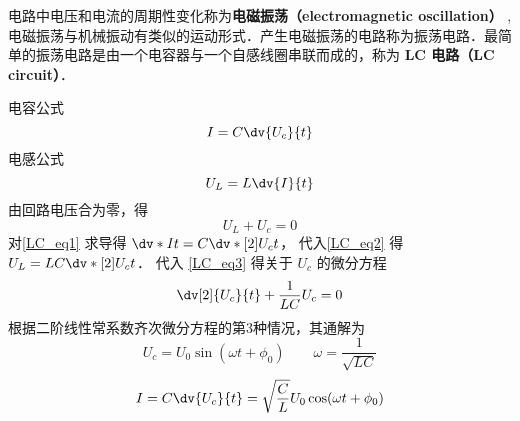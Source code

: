 
电路中电压和电流的周期性变化称为\textbf{电磁振荡（electromagnetic oscillation）} , 电磁振荡与机械振动有类似的运动形式．产生电磁振荡的电路称为振荡电路．最简单的振荡电路是由一个电容器与一个自感线圈串联而成的，称为\textbf{ LC 电路（LC circuit）}．

电容公式
\begin{equation}\label{LC_eq1}
I = C \dv{U_c}{t}
\end{equation}
电感公式
\begin{equation}\label{LC_eq2}
U_L = L \dv{I}{t}
\end{equation}
由回路电压合为零，得
\begin{equation}\label{LC_eq3}
U_L + U_c = 0
\end{equation}
对\autoref{LC_eq1} 求导得 $\dv*{I}{t} = C \dv*[2]{U_c}{t}$， 代入\autoref{LC_eq2} 得 $U_L = LC \dv*[2]{U_c}{t}$． 代入  \autoref{LC_eq3}  得关于 $U_c$ 的微分方程
\begin{equation}
\dv[2]{U_c}{t} + \frac{1}{LC} U_c = 0
\end{equation}
根据二阶线性常系数齐次微分方程的第3种情况，其通解为
\begin{equation}
U_c = U_0 \sin(\omega t + \phi_0) \qquad
\omega  = \frac{1}{\sqrt {LC}}
\end{equation}
\begin{equation}
I = C \dv{U_c}{t} = \sqrt{\frac{C}{L}} U_0 \cos(\omega t + \phi_0)
\end{equation}
 
